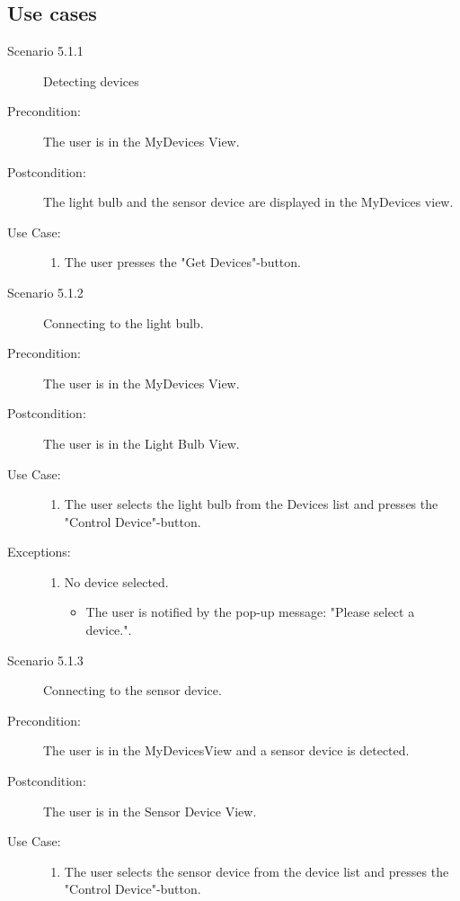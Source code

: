 \documentclass[a4paper]{article}
\begin{document}
\subsection{Use cases}
\begin{description}
\item[Scenario 5.1.1] Detecting devices
\item[Precondition:] The user is in the MyDevices View.
\item[Postcondition:] The light bulb and the sensor device are displayed in the MyDevices view.
\item[Use Case:]\mbox{}
\begin{enumerate}
\item \label{1} The user presses the "Get Devices"-button.
\end{enumerate}

\item[]

\item[Scenario 5.1.2] Connecting to the light bulb.
\item[Precondition:] The user is in the MyDevices View.
\item[Postcondition:] The user is in the Light Bulb View.
\item[Use Case:]\mbox{}
\begin{enumerate}
\item \label{1_bulb} The user selects the light bulb from the Devices list and presses the "Control Device"-button.
\end{enumerate}

\item[Exceptions:] 
\item[]
\begin{enumerate}
\item No device selected.
\begin{itemize}
\item The user is notified by the pop-up message: "Please select a device.".
\end{itemize}

\end{enumerate}


\item[]

\item[Scenario 5.1.3] Connecting to the sensor device.
\item[Precondition:] The user is in the MyDevicesView and a sensor device is detected.
\item[Postcondition:] The user is in the Sensor Device View.
\item[Use Case:]\mbox{}
\begin{enumerate}
\item \label{1_sensor} The user selects the sensor device from the device list and presses the "Control Device"-button.
\end{enumerate}


\end{description}
\end{document}
